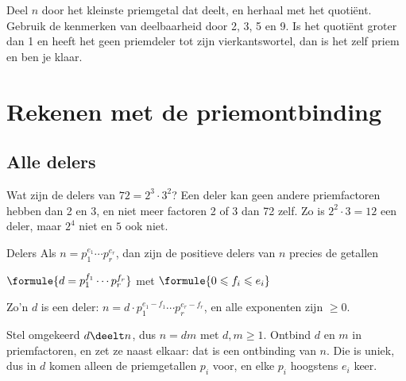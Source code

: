 \begin{werkwijze}
Deel $n$ door het kleinste priemgetal dat deelt, en herhaal met het quotiënt. Gebruik de kenmerken van deelbaarheid door 2, 3, 5 en 9. Is het quotiënt groter dan 1 en heeft het geen priemdeler tot zijn vierkantswortel, dan is het zelf priem en ben je klaar.
\end{werkwijze}


\begin{oefeningen}
\end{oefeningen}

\section{Rekenen met de priemontbinding}

\subsection{Alle delers}

Wat zijn de delers van $72 = 2^3 \cdot 3^2$? Een deler kan geen andere priemfactoren hebben dan 2 en 3, en niet meer factoren 2 of 3 dan 72 zelf. Zo is $2^2 \cdot 3 = 12$ een deler, maar $2^4$ niet en $5$ ook niet.

\begin{theorie}
\begin{stelling}{Delers}
Als $n = p_1^{e_1} \cdots p_r^{e_r}$, dan zijn de positieve delers van $n$ precies de getallen

\vspace{1mm}
\qquad $\formule{d = p_1^{f_1} \cdots p_r^{f_r}}$ \qquad met \qquad $\formule{0 \leqslant f_i \leqslant e_i}$
\end{stelling}

\begin{bewijs}
Zo'n $d$ is een deler: $n = d \cdot p_1^{e_1 - f_1} \cdots p_r^{e_r - f_r}$, en alle exponenten zijn $\geqslant 0$.

Stel omgekeerd $d \deelt n$, dus $n = dm$ met $d, m \geqslant 1$. Ontbind $d$ en $m$ in priemfactoren, en zet ze naast elkaar: dat is een ontbinding van $n$. Die is uniek, dus in $d$ komen alleen de priemgetallen $p_i$ voor, en elke $p_i$ hoogstens $e_i$ keer.
\end{bewijs}
\end{theorie}

